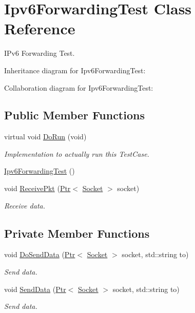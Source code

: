 \hypertarget{classIpv6ForwardingTest}{}\section{Ipv6\+Forwarding\+Test Class Reference}
\label{classIpv6ForwardingTest}


I\+Pv6 Forwarding Test.  




Inheritance diagram for Ipv6\+Forwarding\+Test\+:


Collaboration diagram for Ipv6\+Forwarding\+Test\+:
\subsection*{Public Member Functions}
\begin{DoxyCompactItemize}
\item 
virtual void \hyperlink{classIpv6ForwardingTest_a6144bc09598dfbf6a8974f1342dcce66}{Do\+Run} (void)
\begin{DoxyCompactList}\small\item\em Implementation to actually run this Test\+Case. \end{DoxyCompactList}\item 
\hyperlink{classIpv6ForwardingTest_a4c11295b29660e63b8b588e4f24ae094}{Ipv6\+Forwarding\+Test} ()
\item 
void \hyperlink{classIpv6ForwardingTest_af07be239d02a6e300f27d6892e4d2480}{Receive\+Pkt} (\hyperlink{classns3_1_1Ptr}{Ptr}$<$ \hyperlink{classns3_1_1Socket}{Socket} $>$ socket)
\begin{DoxyCompactList}\small\item\em Receive data. \end{DoxyCompactList}\end{DoxyCompactItemize}
\subsection*{Private Member Functions}
\begin{DoxyCompactItemize}
\item 
void \hyperlink{classIpv6ForwardingTest_a0e6518c7e2b24ecd83cb5857b94588ce}{Do\+Send\+Data} (\hyperlink{classns3_1_1Ptr}{Ptr}$<$ \hyperlink{classns3_1_1Socket}{Socket} $>$ socket, std\+::string to)
\begin{DoxyCompactList}\small\item\em Send data. \end{DoxyCompactList}\item 
void \hyperlink{classIpv6ForwardingTest_a7ebb9024c7b646fc79cb2865cce8c3f2}{Send\+Data} (\hyperlink{classns3_1_1Ptr}{Ptr}$<$ \hyperlink{classns3_1_1Socket}{Socket} $>$ socket, std\+::string to)
\begin{DoxyCompactList}\small\item\em Send data. \end{DoxyCompactList}\end{DoxyCompactItemize}
